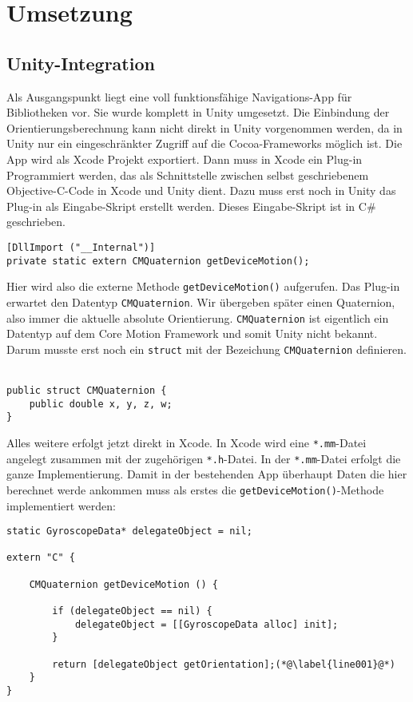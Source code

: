 
\chapter{Umsetzung}
  \label{Umsetzung}
  
  \section{Unity-Integration}
  Als Ausgangspunkt liegt eine voll funktionsfähige Navigations-App für Bibliotheken vor. Sie wurde komplett in Unity umgesetzt. Die Einbindung der Orientierungsberechnung kann nicht direkt in Unity vorgenommen werden, da in Unity nur ein eingeschränkter Zugriff auf die Cocoa-Frameworks möglich ist. Die App wird als Xcode Projekt exportiert. Dann muss in Xcode ein Plug-in Programmiert werden, das als Schnittstelle zwischen selbst geschriebenem Objective-C-Code in Xcode und Unity dient. Dazu muss erst noch in Unity das Plug-in als Eingabe-Skript erstellt werden. Dieses Eingabe-Skript ist in C\# geschrieben.
~\\
\begin{lstlisting}[float=htb, caption=Plug-in in Unity]
[DllImport ("__Internal")]
private static extern CMQuaternion getDeviceMotion();
\end{lstlisting}
  
Hier wird also die externe Methode \texttt{getDeviceMotion()} aufgerufen. Das Plug-in erwartet den Datentyp \texttt{CMQuaternion}. Wir übergeben später einen Quaternion, also immer die aktuelle absolute Orientierung. \texttt{CMQuaternion} ist eigentlich ein Datentyp auf dem Core Motion Framework und somit Unity nicht bekannt. Darum musste erst noch ein \texttt{struct} mit der Bezeichung \texttt{CMQuaternion} definieren.
~\\
\begin{lstlisting}[float=htb, caption=Struct \texttt{CMQuaternion} in C\#]
public struct CMQuaternion {
	public double x, y, z, w;
}
\end{lstlisting}

Alles weitere erfolgt jetzt direkt in Xcode. In Xcode wird eine \texttt{*.mm}-Datei angelegt zusammen mit der zugehörigen \texttt{*.h}-Datei. In der \texttt{*.mm}-Datei erfolgt die ganze Implementierung. Damit in der bestehenden App überhaupt Daten die hier berechnet werde ankommen muss als erstes die \texttt{getDeviceMotion()}-Methode implementiert werden:
~\\
\begin{lstlisting}[float=htb, caption=Methode \texttt{getDeviceMotion}]
static GyroscopeData* delegateObject = nil;

extern "C" {

	CMQuaternion getDeviceMotion () {

		if (delegateObject == nil) {
			delegateObject = [[GyroscopeData alloc] init];
		}
		
		return [delegateObject getOrientation];(*@\label{line001}@*)
	}    
}
\end{lstlisting}

